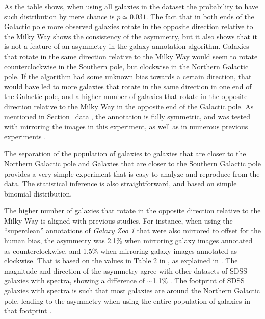 \documentclass[final,5p,times,twocolumn]{article}
\begin{document}
As the table shows, when using all galaxies in the dataset the probability to have such distribution by mere chance is $p\simeq0.031$. The fact that in both ends of the Galactic pole more observed galaxies rotate in the opposite direction relative to the Milky Way shows the consistency of the asymmetry, but it also shows that it is not a feature of an asymmetry in the galaxy annotation algorithm. Galaxies that rotate in the same direction relative to the Milky Way would seem to rotate counterclockwise in the Southern pole, but clockwise in the Northern Galactic pole. If the algorithm had some unknown bias towards a certain direction, that would have led to more galaxies that rotate in the same direction in one end of the Galactic pole, and a higher number of galaxies that rotate in the opposite direction relative to the Milky Way in the opposite end of the Galactic pole. As mentioned in Section~\ref{data}, the annotation is fully symmetric, and was tested with mirroring the images in this experiment, as well as in numerous previous experiments \citep{shamir2019large,shamir2020patterns,shamir2020pasa,shamir2021particles,shamir2022asymmetry,shamir2022asymmetry,shamir2021large,shamir2022analysis,shamir2024galaxy}.

The separation of the population of galaxies to galaxies that are closer to the Northern Galactic pole and Galaxies that are closer to the Southern Galactic pole provides a very simple experiment that is easy to analyze and reproduce from the data. The statistical inference is also straightforward, and based on simple binomial distribution.

The higher number of galaxies that rotate in the opposite direction relative to the Milky Way is aligned with previous studies. For instance, when using the ``superclean'' annotations of {\it Galaxy Zoo 1} \citep{land2008galaxy} that were also mirrored to offset for the human bias, the asymmetry was 2.1\% when mirroring galaxy images annotated as counterclockwise, and 1.5\% when mirroring galaxy images annotated as clockwise. That is based on the values in Table 2 in \citep{land2008galaxy}, as explained in \citep{shamir2022analysis,mcadam2023reanalysis,shamir2023large,shamir2024galaxy}. The magnitude and direction of the asymmetry agree with other datasets of SDSS galaxies with spectra, showing a difference of $\sim$1.1\% \citep{shamir2020patterns}. The footprint of SDSS galaxies with spectra is such that most galaxies are around the Northern Galactic pole, leading to the asymmetry when using the entire population of galaxies in that footprint \citep{shamir2023large}. 
\end{document}
